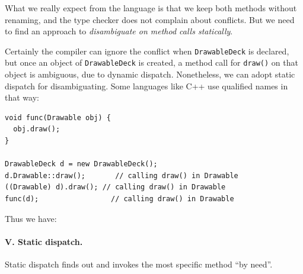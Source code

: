 What we really expect from the language is that we keep both methods
without renaming, and the type checker does not complain about 
conflicts. But we need to find an approach to \emph{disambiguate on method
calls statically}.

Certainly the compiler can ignore the conflict when
\lstinline|DrawableDeck| is declared, but once an object of
\lstinline|DrawableDeck| is created, a method call for
\lstinline|draw()| on that object is ambiguous, due to dynamic
dispatch. Nonetheless, we can adopt static dispatch for
disambiguating. Some languages like C++ use qualified names in that
way:

\vspace{3pt}\begin{lstlisting}
void func(Drawable obj) {
  obj.draw();
}

DrawableDeck d = new DrawableDeck();
d.Drawable::draw();       // calling draw() in Drawable
((Drawable) d).draw(); // calling draw() in Drawable
func(d);                 // calling draw() in Drawable
\end{lstlisting}\vspace{3pt}
Thus we have: \paragraph{V. Static dispatch.} Static dispatch finds out and invokes the most specific method ``by need''.

